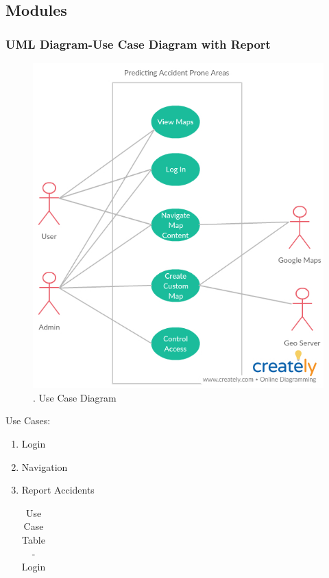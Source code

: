 \documentclass{article}
\begin{document}
\begin{flushleft}
            \newpage
        \subsection{Modules}
            \subsubsection{UML Diagram-Use Case Diagram with Report}
            \begin{figure}[!ht]
              
              \includegraphics[width=12cm]{UseCase.jpg}
              \renewcommand{\thefigure}{ \thesubsection.\arabic{figure}}
              \caption{ .  Use Case Diagram}
            \end{figure}
            \newpage
            Use Cases:
            \begin{enumerate}
                \item Login
                \item Navigation
                \item Report Accidents
                
                \begin{center}
           \begin{table}[!ht]
           \renewcommand\thetable{4.2.1}
               \centering
               \caption{Use Case Table - Login}
               \label{""""}
              \begin{tabular}{ | m{7em} | m{7cm} | }
           

\end{tabular}
\end{table}
\end{center}
\end{enumerate}
\end{flushleft}
\end{document}
